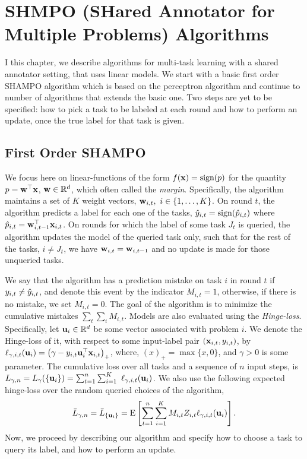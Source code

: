 \chapter{SHMPO (SHared Annotator for Multiple Problems) Algorithms}

I this chapter, we describe algorithms for multi-task learning with
a shared annotator setting, that uses linear models. We start with a basic first order SHAMPO algorithm 
which is based on the perceptron algorithm 
and continue to number of algorithms that extends the basic one. Two steps are
yet to be specified: how to pick a task to be labeled at each round and how to
perform an update, once the true label for that task is given.

\section{First Order SHAMPO}

We focus here on linear-functions of the form $f(\mathbf{x})={\rm sign}(p)$ for the
quantity $p={\mathbf{w}}^{\top}\mathbf{x}$, $\mathbf{w}\in\mathbb{R}^d$,  which often called the
\textit{margin}.
Specifically, the algorithm maintains a set of $K$ weight
vectors, $\mathbf{w}_{i,t},~i\in\left\{{1, \ldots , K}\right\}$. On round $t$, the algorithm predicts a label for each
 one of the tasks, $\hat{y}_{i,t}={\rm sign}(\hat{p}_{i,t})$ where $\hat{p}_{i,t}={\mathbf{w}}^{\top}_{i,t-1}\mathbf{x}_{i,t}$. 
 On rounds for which the label of some task $J_t$ is queried, the algorithm updates the model of the
 queried task only, such that for the rest of the tasks, $i\neq J_t$, we have $\mathbf{w}_{i,t}=\mathbf{w}_{i,t-1}$ and no
 update is made for those unqueried tasks.       

We say that the algorithm has a prediction mistake on task $i$ in round $t$ if
$y_{i,t} \neq \hat{y}_{i,t}$, and denote this event by the indicator $M_{i,t}=1$,
otherwise, if there is no mistake, we set $M_{i,t}=0$. The goal of the
algorithm is to minimize the cumulative mistakes $\sum_t \sum_i
M_{i,t}$. Models are also evaluated using the
{\em Hinge-loss}. Specifically, let $\mathbf{u}_{i}\in\mathbb{R}^d$ be some vector
associated with problem $i$. We denote the Hinge-loss of it, with respect
to some input-label  pair $\left({\mathbf{x}_{i,t},y_{i,t}}\right)$, by
$\ell_{\gamma,i,t}(\mathbf{u}_{i})= \left({\gamma-y_{i,t}
  {\mathbf{u}}^{\top}_{i}\mathbf{x}_{i,t}}\right)_+$, where, $(x)_+=\max\{x,0\}$, and $\gamma>0$ is
some parameter. The cumulative loss over all tasks and a sequence of
$n$ input steps, is
$ L_{\gamma,n} =L_{\gamma}(\{ \vui{i} \})=\sum_{t=1}^{n} \sum_{i=1}^{K}\ {\lossp{\gamma,i,t}(\vui{i})}$.
We also use the following expected hinge-loss over the random queried choices
of the algorithm, 
\begin{equation*}
\bar{L}_{\gamma,n}=\bar{L}_{ \{ \mathbf{u}_{i}\}}
={\rm E}\left[{\sum_{t=1}^n \sum_{i=1}^{K}{M_{i,t}Z_{i,t}\ell_{\gamma,i,t}(\mathbf{u}_{i})}}\right]. 
 \end{equation*}
Now, we proceed by  describing our algorithm and specify how to choose a task to query its label,
 and how to perform an update.
 

